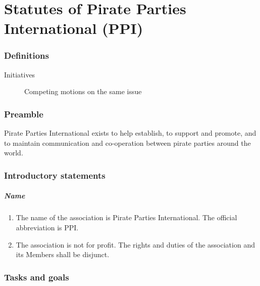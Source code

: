 \part{Statutes of Pirate Parties International (PPI)}
\label{statutesofpiratepartiesinternationalppi}

\section{Definitions}
\label{definitions}

\begin{description}

\item[Initiatives]

Competing motions on the same issue
\end{description}

\section{Preamble}
\label{preamble}

Pirate Parties International exists to help establish, to support and promote, and to maintain communication and co-{}operation between pirate parties around the world.

\section{Introductory statements}
\label{introductorystatements}

\begin{frame}

\frametitle{Name}
\label{name}

\begin{enumerate}
\item The name of the association is Pirate Parties International. The official abbreviation is PPI.

\item The association is not for profit. The rights and duties of the association and its Members shall be disjunct.

\end{enumerate}

\end{frame}

\section{Tasks and goals}
\label{tasksandgoals}

